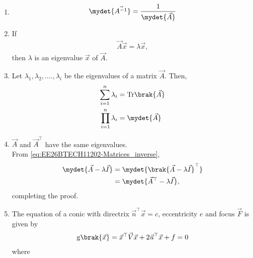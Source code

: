 \begin{enumerate}[label=\thesubsection.\arabic*, ref=\thesubsection.\theenumi]
\begin{align}
&= \mydet{\vec{E}_1} \mydet{\vec{E}_2} \cdots \mydet{\vec{E}_k} \mydet{\vec{B}}
\label{eq:EE26BTECH11202-Matrices_1-AB} 
\end{align}
For $\vec{B}=\vec{I}$, 
\begin{align}
\mydet{\vec{A}} = \mydet{\vec{E}_1} \mydet{\vec{E}_2} \cdots \mydet{\vec{E}_k}
\end{align}
which upon substituting in 
\eqref{eq:EE26BTECH11202-Matrices_1-AB} 
yields
\begin{align}
	\mydet{\vec{A}\vec{B}} = \mydet{\vec{A}}\mydet{\vec{B}} \label{eq:EE26BTECH11202-product_determinant}
\end{align}
\item 
\begin{align}
\mydet{\vec{A^{-1}}} = \frac{1}{\mydet{\vec{A}}} \label{eq:EE26BTECH11202-Matrices_inverse}
\end{align}
\item If
\begin{align}
\vec{A}
\vec{x}
=\lambda\vec{x},
\label{eq:EE26BTECH11202-eig-def}
\end{align}
then 
	$\lambda$ is an eigenvalue 
$\vec{x}$
of 
$\vec{A}$.
\item Let $\lambda_1, \lambda_2, .... , \lambda_i$ be the eigenvalues of a matrix $\vec{A}$. Then, 
\begin{align}
	\sum_{i=1}^{n} \lambda_i &= \text{Tr}\brak{\vec{A}} \label{eq:EE26BTECH11202-Matrices_2}
	\\
	\prod_{i=1}^{n} \lambda_i &= \mydet{\vec{A}} \label{eq:EE26BTECH11202-Matrices_3}
\end{align}
\item $\vec{A}$ and $\vec{A}^{\top}$ have the same eigenvalues.
	\\
	\solution From  \eqref{eq:EE26BTECH11202-Matrices_inverse},
\begin{align}
\mydet{\vec{A} - \lambda \vec{I}}
&=
\mydet{\brak{\vec{A} - \lambda \vec{I}}^{\top}}
\\
&=
\mydet{\vec{A}^{\top} - \lambda \vec{I}},
\end{align}
completing the proof.
\item
The equation of  a conic with directrix $\vec{n}^{\top}\vec{x} = c$, eccentricity $e$ and focus $\vec{F}$ is given by 
\begin{align}
    \label{eq:EE26BTECH11202-app-conic_quad_form}
	\text{g}\brak{\vec{x}} = \vec{x}^{\top}\vec{V}\vec{x}+2\vec{u}^{\top}\vec{x}+f=0
    \end{align}
where     
\begin{align}

\end{align}
\end{enumerate}

